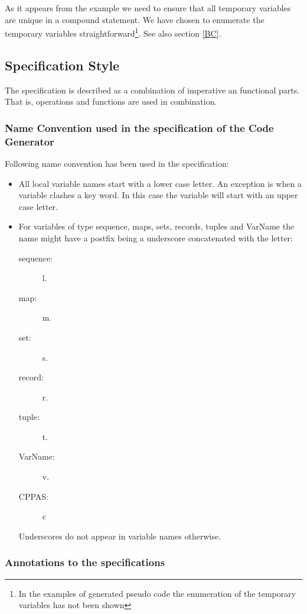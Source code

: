 \documentclass[a4paper,dvips]{article}
\begin{document}
As it appears from the example we need to ensure that all temporary
variables are unique in a compound statement. We have chosen to
enumerate the temporary variables straightforward\footnote{In the
  examples of generated pseudo code the enumeration of the temporary
  variables has not been shown}. See also section \ref{BC}.


\subsection{Specification Style}

The specification is described as a combination of imperative an
functional parts. That is, operations and functions are used in
combination.

\subsubsection{Name Convention used in the specification of the Code Generator}

Following name convention has been used in the specification:
\begin{itemize}

\item All local variable names start with a lower case letter. An
  exception is when a variable clashes a key word. In this case the
  variable will start with an upper case letter.

\item For variables of type sequence, maps, sets, records, tuples and
  VarName the name might have a postfix being a underscore
  concatenated with the letter:
\begin{description}
\item[sequence: ] l.
\item[map: ] m.
\item[set: ] s.
\item[record: ] r.
\item[tuple: ] t.
\item[VarName: ] v.
\item[CPPAS: ] c
\end{description}
Underscores do not appear in variable names otherwise.

\end{itemize}


\subsubsection{Annotations to the specifications} 
\label{annospec:sec}
\end{document}
